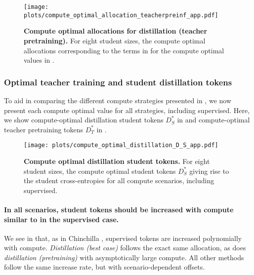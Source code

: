 \begin{figure}[h]
	\centering
	\texttt{[image: plots/compute\_optimal\_allocation\_teacherpreinf\_app.pdf]}
	\caption{\textbf{Compute optimal allocations for distillation (teacher pretraining).} For eight student sizes, the compute optimal allocations corresponding to the terms in  for the compute optimal values in .
	}
	\label{fig:compute-optimal-allocation-teacherpreinf-app}
\end{figure}

\FloatBarrier
\subsubsection{Optimal teacher training and student distillation tokens}
\label{sssec:training-tokens}

To aid in comparing the different compute strategies presented in ,
we now present each compute optimal value for all strategies, including supervised.
Here, we show compute-optimal distillation student tokens $D_S^*$ in 
and compute-optimal teacher pretraining tokens $D_T^*$ in .

\begin{figure}[h]
	\centering
        \vspace{-0.2cm}
	\texttt{[image: plots/compute\_optimal\_distillation\_D\_S\_app.pdf]}
        \vspace{-0.2cm}
	\caption{\textbf{Compute optimal distillation student tokens.} For eight student sizes, the compute optimal student tokens $D_S^*$ giving rise to the student cross-entropies for all compute scenarios, including supervised.
	}
        \vspace{-0.2cm}
	\label{fig:compute-optimal-distillation-student-tokens-app}
\end{figure}

\paragraph{In all scenarios, student tokens should be increased with compute similar to in the supervised case.}
We see in 
that, as in Chinchilla \citep{DBLP:journals/corr/abs-2203-15556},
supervised tokens are increased polynomially with compute.
\emph{Distillation (best case)} follows the exact same allocation,
as does \emph{distillation (pretraining)} with asymptotically large compute.
All other methods follow the same increase rate, but with scenario-dependent offsets.

